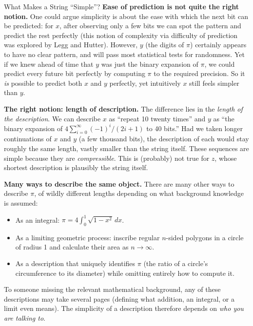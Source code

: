 \documentclass[aspectratio=169,10pt]{beamer}
\begin{document}
\begin{frame}[allowframebreaks]{What Makes a String ``Simple''?}
  \textbf{Ease of prediction is not quite the right notion.} One could
  argue simplicity is about the ease with which the next bit can be
  predicted: for $x$, after observing only a few bits we can spot the
  pattern and predict the rest perfectly (this notion of complexity via
  difficulty of prediction was explored by Legg and Hutter). However, $y$
  (the digits of $\pi$) certainly appears to have no clear pattern, and
  will pass most statistical tests for randomness. Yet if we knew ahead of
  time that $y$ was just the binary expansion of $\pi$, we could predict
  every future bit perfectly by computing $\pi$ to the required precision.
  So it \emph{is} possible to predict both $x$ and $y$ perfectly, yet
  intuitively $x$ still feels simpler than $y$.

  \bigskip
  \textbf{The right notion: length of description.} The difference lies in
  the \emph{length of the description}. We can describe $x$ as ``repeat 10
  twenty times'' and $y$ as ``the binary expansion of
  $4\sum_{i=0}^{\infty}(-1)^i/(2i+1)$ to 40 bits.'' Had we taken longer
  continuations of $x$ and $y$ (a few thousand bits), the description of
  each would stay roughly the same length, vastly smaller than the string
  itself. These sequences are simple because they are
  \emph{compressible}. This is (probably) not true for $z$, whose
  shortest description is plausibly the string itself.

  \framebreak

  \textbf{Many ways to describe the same object.} There are many other ways
  to describe $\pi$, of wildly different lengths depending on what
  background knowledge is assumed:
  \begin{itemize}
    \item As an integral: $\displaystyle \pi = 4\int_0^1 \sqrt{1-x^2}\,dx$.
    \item As a limiting geometric process: inscribe regular $n$-sided
      polygons in a circle of radius 1 and calculate their area as
      $n\to\infty$.
    \item As a description that uniquely identifies $\pi$ (the ratio of a
      circle's circumference to its diameter) while omitting entirely how
      to compute it.
  \end{itemize}
  To someone missing the relevant mathematical background, any of these
  descriptions may take several pages (defining what addition, an
  integral, or a limit even means). The simplicity of a description
  therefore depends on \emph{who you are talking to}.


\end{frame}
\end{document}

